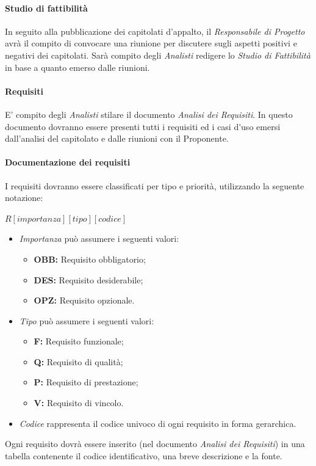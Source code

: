 \paragraph{Studio di fattibilità}
In seguito alla pubblicazione dei capitolati d'appalto, il \textit{Responsabile di Progetto} avrà il compito di convocare una riunione per discutere sugli aspetti positivi e negativi dei capitolati. Sarà compito degli \textit{Analisti} redigere lo \textit{Studio di Fattibilità} in base a quanto emerso dalle riunioni.

\paragraph{Requisiti}
E' compito degli \textit{Analisti} stilare il documento \textit{Analisi dei Requisiti}.
In questo documento dovranno essere presenti tutti i requisiti ed i \gls{casi d'uso} emersi dall'analisi del capitolato e dalle riunioni con il Proponente.\\

\paragraph{Documentazione dei requisiti}

I requisiti dovranno essere classificati per tipo e priorità, utilizzando la seguente notazione:

\begin{center}
	\begin{math}
		R \left [ importanza \right ] \left [ tipo\right ]\left [codice\right ]
	\end{math}
\end{center}
\begin{itemize}
	\item \textit{Importanza} può assumere i seguenti valori:
	\begin{itemize}
		\item \textbf{OBB:} Requisito obbligatorio;
		\item \textbf{DES:} Requisito desiderabile;
		\item \textbf{OPZ:} Requisito opzionale.
	\end{itemize}
	\item \textit{Tipo} può assumere i seguenti valori:
	\begin{itemize}
		\item \textbf{F:} Requisito funzionale;
		\item \textbf{Q:} Requisito di qualità;
		\item \textbf{P:} Requisito di prestazione;
		\item \textbf{V:} Requisito di vincolo.
	\end{itemize}
	\item \textit{Codice} rappresenta il codice univoco di ogni requisito in forma gerarchica.
\end{itemize}
Ogni requisito dovrà essere inserito (nel documento \textit{Analisi dei Requisiti}) in una tabella contenente il codice identificativo, una breve descrizione e la fonte.

